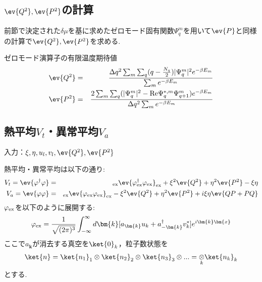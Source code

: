 \documentclass[10.5pt,a4paper]{jreport}
\begin{document}
\subsection{$\ev{Q^2},\ev{P^2}$の計算}

前節で決定された$\delta \mu$を基に求めたゼロモード固有関数$\Psi^m_q$を用いて$\ev{P}$と同様の計算で$\ev{Q^2},\ev{P^2}$を求める.
\begin{itembox}[c]{ゼロモード演算子の有限温度期待値}
  \begin{eqnarray}
    \ev{Q^2}&=& \frac{\Delta q^2\sum_m\sum_q(q - \frac{N_q}{2})|\Psi_q^m|^2e^{-\beta E_m}}{\sum_me^{-\beta E_m}}\\
    \ev{P^2}&=& \frac{2\sum_m\sum_q(|\Psi_q^m|^2-{\rm Re}\Psi_q^{*,m}\Psi_{q+1}^m)e^{-\beta E_m}}{\Delta q^2\sum_me^{-\beta E_m}}
  \end{eqnarray}
\end{itembox}

\subsection{熱平均$V_t$・異常平均$V_a$}
入力：$\xi, \eta, u_l, v_l, \ev{Q^2}, \ev{P^2}$

熱平均・異常平均は以下の通り:
\begin{eqnarray}
  V_t = \ev{\varphi^\dagger\varphi} &=& _{{\rm ex}}\ev{\varphi^\dagger_{{\rm ex}}\varphi_{{\rm ex}}}_{{\rm ex}} + \xi^2\ev{Q^2} + \eta^2\ev{P^2} -\xi\eta \\
  V_a = \ev{\varphi\varphi} &=& _{{\rm ex}}\ev{\varphi_{{\rm ex}}\varphi_{{\rm ex}}}_{{\rm ex}} - \xi^2\ev{Q^2} + \eta^2\ev{P^2} + i\xi\eta\ev{QP+PQ} 
\end{eqnarray}
$\varphi_{\rm ex}$を以下のように展開する:
\begin{eqnarray}
  \varphi_{\rm ex} = \frac{1}{\sqrt{(2\pi)^3}}\int^{\infty}_{-\infty} d\bm{k}[a_{\bm{k}}u_k + a^\dagger_{-\bm{k}} v_k^*]e^{i\bm{k}\bm{x}}
\end{eqnarray}
ここで$a_{\bm{k}}$が消去する真空を$\ket{0}_k$，粒子数状態を
\begin{eqnarray}
  \ket{n} = \ket{n_1}_1\otimes\ket{n_2}_2\otimes\ket{n_3}_3\otimes... = \underset{k}{\otimes}\ket{n_k}_k
\end{eqnarray}
とする.
\end{document}
